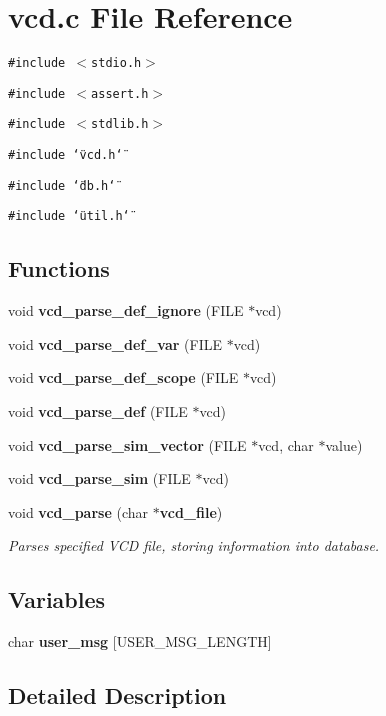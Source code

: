 \section{vcd.c File Reference}
\label{vcd_8c}
{\tt \#include $<$stdio.h$>$}\par
{\tt \#include $<$assert.h$>$}\par
{\tt \#include $<$stdlib.h$>$}\par
{\tt \#include \char`\"{}vcd.h\char`\"{}}\par
{\tt \#include \char`\"{}db.h\char`\"{}}\par
{\tt \#include \char`\"{}util.h\char`\"{}}\par
\subsection*{Functions}
\begin{CompactItemize}
\item 
void {\bf vcd\_\-parse\_\-def\_\-ignore} (FILE $\ast$vcd)
\item 
void {\bf vcd\_\-parse\_\-def\_\-var} (FILE $\ast$vcd)
\item 
void {\bf vcd\_\-parse\_\-def\_\-scope} (FILE $\ast$vcd)
\item 
void {\bf vcd\_\-parse\_\-def} (FILE $\ast$vcd)
\item 
void {\bf vcd\_\-parse\_\-sim\_\-vector} (FILE $\ast$vcd, char $\ast$value)
\item 
void {\bf vcd\_\-parse\_\-sim} (FILE $\ast$vcd)
\item 
void {\bf vcd\_\-parse} (char $\ast${\bf vcd\_\-file})
\begin{CompactList}\small\item\em Parses specified VCD file, storing information into database.\item\end{CompactList}\end{CompactItemize}
\subsection*{Variables}
\begin{CompactItemize}
\item 
char {\bf user\_\-msg} [USER\_\-MSG\_\-LENGTH]
\end{CompactItemize}


\subsection{Detailed Description}



